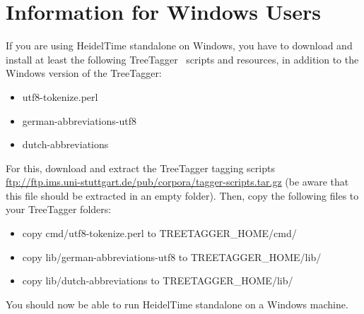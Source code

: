 \appendix
\section{Information for Windows Users}\label{app:windows}
If you are using HeidelTime standalone on Windows, you have to download and install at least the following TreeTagger~\cite{TreeTagger} scripts and resources, in addition to the Windows version of the TreeTagger:
\begin{itemize}
 \item utf8-tokenize.perl
 \item german-abbreviations-utf8
 \item dutch-abbreviations
\end{itemize}

For this, download and extract the TreeTagger tagging scripts\\
 \url{ftp://ftp.ims.uni-stuttgart.de/pub/corpora/tagger-scripts.tar.gz} (be aware that this file should be extracted in an empty folder). Then, copy the following files to your TreeTagger folders:
\begin{itemize}
 \item copy cmd/utf8-tokenize.perl to TREETAGGER\_HOME/cmd/
 \item copy lib/german-abbreviations-utf8 to TREETAGGER\_HOME/lib/
 \item copy lib/dutch-abbreviations to TREETAGGER\_HOME/lib/
\end{itemize}

You should now be able to run HeidelTime standalone on a Windows machine.
